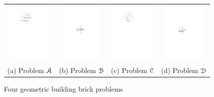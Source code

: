 \documentclass[sigconf]{acmart}
\def\figcapup{\vspace{-0mm}}
\def\figcapdown{\vspace{-0mm}}
\begin{document}
\begin{figure}
    \begin{tabular}{cccc}
        \includegraphics[height=30mm]{./artwork/prob-a} & 
        \hspace{3mm}
        \includegraphics[height=30mm]{./artwork/prob-b} &
        \hspace{3mm}
        \includegraphics[height=30mm]{./artwork/prob-c} &
        \hspace{3mm}
        \includegraphics[height=30mm]{./artwork/prob-d} \\
        (a) Problem $\EuScript{A}$ &
        \hspace{3mm}
        (b) Problem $\EuScript{B}$ &
        \hspace{3mm}
        (c) Problem $\EuScript{C}$ &
        \hspace{3mm}
        (d) Problem $\EuScript{D}$
    \end{tabular}

    \figcapup
    \caption{Four geometric building brick problems}
    \label{fig:probs}
    \figcapdown
\end{figure}
\end{document}
